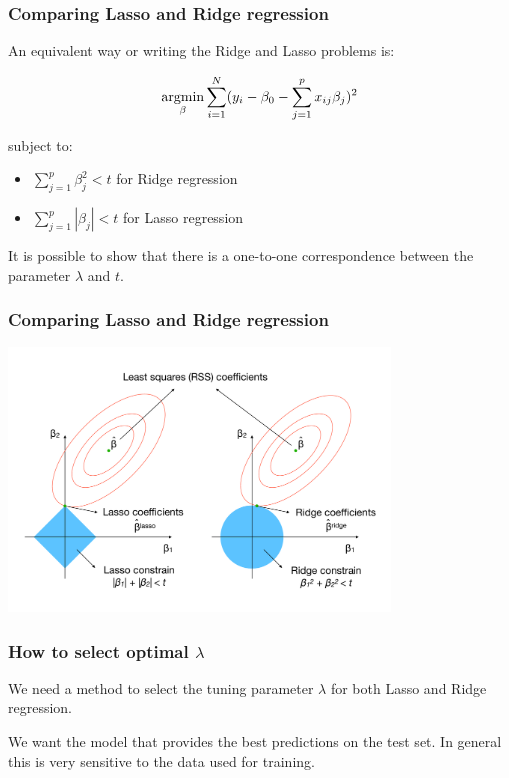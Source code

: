 \documentclass[notes]{beamer}          %
\newcommand{\argmin}{\operatornamewithlimits{argmin}}
\begin{document}
\begin{frame}
\frametitle{Comparing Lasso and Ridge regression}

An equivalent way or writing the Ridge and Lasso problems is:

\begin{equation*}
    \argmin_{\beta} \sum_{i=1}^N (y_i - \beta_0 -  \sum_{j=1}^p x_{ij}\beta_j)^2
\end{equation*}

subject to: 
\begin{itemize}
    \item $\sum_{j=1}^p \beta_j^2 < t$ for Ridge regression
    \item $\sum_{j=1}^p | \beta_j | < t$ for Lasso regression
\end{itemize}

\vspace{5mm} 

It is possible to show that there is a one-to-one correspondence between the parameter $\lambda$ and $t$.

\end{frame}


\begin{frame}
\frametitle{Comparing Lasso and Ridge regression}

\begin{center}
\includegraphics[height=7cm]{../figures/week_2_linear_models/Comparison_lasso_ridge.pdf}
\end{center}

\end{frame}


\begin{frame}
\frametitle{How to select optimal $\lambda$}

We need a method to select the tuning parameter $\lambda$ for both Lasso and Ridge regression.

\vspace{5mm} 

We want the model that provides the best predictions on the test set. In general this is very sensitive to the data used for training.
\end{frame}
\end{document}
